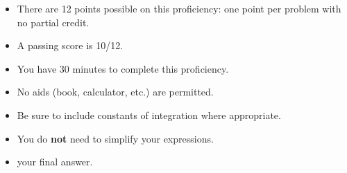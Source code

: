 \documentclass[12pt]{article}
\begin{document}
\begin{itemize}
\item 
There are 12 points possible on this proficiency: one point per problem with
no partial credit. 

\item A passing score is 10/12.

\item You have 30 minutes to complete this proficiency.

\item No aids (book, calculator, etc.) are permitted.  

\item Be sure to include constants of integration where appropriate.

\item You do \textbf{not} need to simplify your expressions.



\item %
 your final answer.

\end{itemize}

\newcommand{\ans}{\ \rule{3in}{.01in}}
\end{document}
